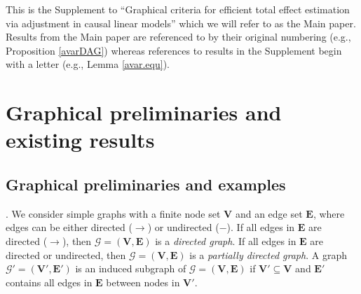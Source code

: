 \documentclass[11pt,a4paper]{article}
\theoremstyle{definition}
\theoremstyle{remark}
\newcommand{\g}[1][G]{\mathcal{#1}}
\begin{document}



This is the Supplement to ``Graphical criteria for efficient total effect estimation via adjustment in causal linear models'' which we will refer to as the Main paper. Results from the Main paper are referenced to by their original numbering (e.g., Proposition \ref{avarDAG}) whereas references to results in the Supplement begin with a letter (e.g., Lemma \ref{avar.equ}).




 \section{Graphical preliminaries and existing results}
 

\subsection{Graphical preliminaries and examples}
\label{graph-supp}

. 
We consider simple graphs with a finite node set $\mathbf{V}$ and an edge set $\mathbf{E}$, where
edges can be either directed ($\to$) or undirected ($-$).  
If all edges in $\mathbf{E}$ are directed ($\to$), then $\g = (\mathbf{V},\mathbf{E})$ is a \emph{directed graph}. If all edges in $\mathbf{E}$ are directed or undirected, then $\g =  (\mathbf{V},\mathbf{E})$ is a \textit{partially directed graph}. A graph $\g' = (\mathbf{V'},\mathbf{E'})$ is an induced subgraph of $\g = (\mathbf{V,E})$ if $\mathbf{V'} \subseteq \mathbf{V}$ and $\mathbf{E'}$ contains all edges in $\mathbf{E}$ between nodes in $\mathbf{V'}$. 
\end{document}
